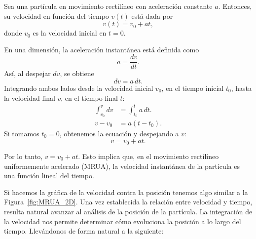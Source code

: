 \begin{proposition}{}{}
    Sea una partícula en movimiento rectilíneo con aceleración constante $a$. Entonces, su velocidad en función del tiempo $v(t)$ está dada por
    $$v(t) = v_0 + at,$$
    donde $v_0$ es la velocidad inicial en $t = 0$.
    \vspace{2mm}
    \begin{demo}
        En una dimensión, la aceleración instantánea está definida como
        $$a = \frac{dv}{dt}.$$
        Así, al despejar $dv$, se obtiene
        $$dv = a \, dt.$$
        Integrando ambos lados desde la velocidad inicial $v_0$, en el tiempo inicial $t_0$, hasta la velocidad final $v$, en el tiempo final $t$:
        \begin{align*}
            \int_{v_0}^v dv &= \int_{t_0}^{t} a \, dt. \\
            v - v_0 &= a (t - t_0).
        \end{align*}
        Si tomamos $t_0 = 0$, obtenemos la ecuación y despejando a $v$:
        $$v = v_0 + at.$$
        
        Por lo tanto, $v = v_0 + at$. Esto implica que, en el movimiento rectilíneo uniformemente acelerado (MRUA), la velocidad instantánea de la partícula es una función lineal del tiempo.
    \end{demo}
\end{proposition}

Si hacemos la gráfica de la velocidad contra la posición tenemos algo similar a la Figura~\ref{fig:MRUA_2D}. Una vez establecida la relación entre velocidad y tiempo, resulta natural avanzar al análisis de la posición de la partícula. La integración de la velocidad nos permite determinar cómo evoluciona la posición a lo largo del tiempo. Llevándonos de forma natural a la siguiente:

